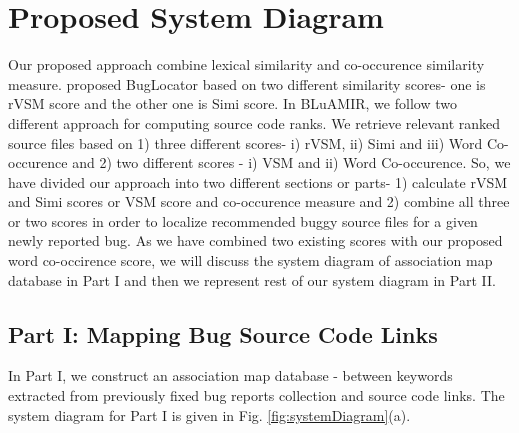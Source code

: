 \documentclass[conference]{IEEEtran}
\begin{document}
\section{Proposed System Diagram}\label{sec:proposedsystemDiagram}
Our proposed approach combine lexical similarity and co-occurence similarity measure.  \citet{Jian} proposed BugLocator based on two different similarity scores- one is rVSM score and the other one is Simi score. 
In BLuAMIR, we follow two different approach for computing source code ranks. We retrieve relevant ranked source files based on 1) three different scores- i) rVSM, ii) Simi and iii) Word Co-occurence and 2) two different scores - i) VSM and ii) Word Co-occurence.  So,
we have divided our approach into two different sections or parts- 1) calculate rVSM and Simi scores or VSM score and co-occurence measure and 2) combine all three or two scores in order to localize recommended buggy source files for a given newly reported bug. As we have combined two existing scores with our proposed word co-occirence score, we will discuss the system diagram of association map database in Part I and then we represent rest of our system diagram in Part II.

\subsection{Part I: Mapping Bug Source Code Links}
In Part I, we construct an association map database - between keywords extracted from previously fixed bug reports collection and source code links. The system diagram for Part I is given in Fig. \ref{fig:systemDiagram}(a).
\end{document}
